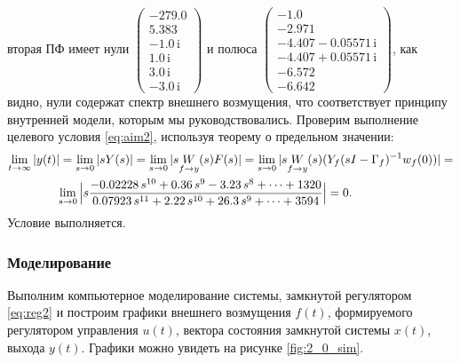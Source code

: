 вторая ПФ имеет нули $\left(\begin{array}{c}
-279.0\\
5.383\\
-1.0\,\mathrm{i}\\
1.0\,\mathrm{i}\\
3.0\,\mathrm{i}\\
-3.0\,\mathrm{i}
\end{array}\right)$ и полюса $\left(\begin{array}{c}
-1.0\\
-2.971\\
-4.407-0.05571\,\mathrm{i}\\
-4.407+0.05571\,\mathrm{i}\\
-6.572\\
-6.642
\end{array}\right)$,
как видно, нули содержат спектр внешнего возмущения, что 
соответствует принципу внутренней модели, которым мы руководствовались.
Проверим выполнение целевого условия \eqref{eq:aim2}, используя теорему о предельном
значении:
\begin{multline*}
    \lim_{t\rightarrow\infty}|y(t)|=\lim_{s\rightarrow0}|sY(s)|=
    \lim_{s\rightarrow0}|s\underset{f\rightarrow y}{W}(s)F(s)|=
    \lim_{s\rightarrow0}|s\underset{f\rightarrow y}{W}(s)(Y_f(sI-\Gamma_f)^{-1}w_{f}(0))|=\\
    \hspace*{-1.5cm}\lim_{s\rightarrow0}\Big|s\frac{-0.02228\,s^{10} +0.36\,s^9 -3.23\,s^8 +\dots+1320}{0.07923\,s^{11} +2.22\,s^{10} +26.3\,s^9 +\dots+3594}\Big|=0.
\end{multline*}
Условие выполняется.

\subsubsection{Моделирование}

Выполним компьютерное моделирование системы, замкнутой регулятором
\eqref{eq:reg2} и построим графики внешнего возмущения $f(t)$, формируемого 
регулятором управления $u(t)$, вектора состояния замкнутой системы $x(t)$, выхода
$y(t)$. Графики можно увидеть на рисунке \ref{fig:2_0_sim}.

